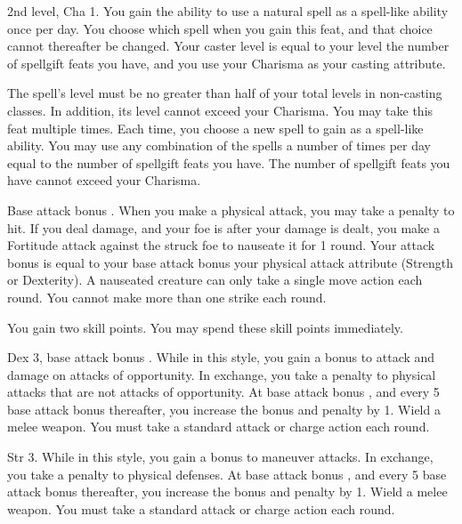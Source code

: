 \featpre 2nd level, Cha 1.
\featben You gain the ability to use a natural spell as a spell-like ability once per day. You choose which spell when you gain this feat, and that choice cannot thereafter be changed. Your caster level is equal to your level \add the number of spellgift feats you have, and you use your Charisma as your casting attribute.

The spell's level must be no greater than half of your total levels in non-casting classes. In addition, its level cannot exceed your Charisma.
 You may take this feat multiple times. Each time, you choose a new spell to gain as a spell-like ability. You may use any combination of the spells a number of times per day equal to the number of spellgift feats you have. The number of spellgift feats you have cannot exceed your Charisma.

\featpre Base attack bonus .
\featben When you make a physical attack, you may take a  penalty to hit. If you deal damage, and your foe is \bloodied after your damage is dealt, you make a Fortitude attack against the struck foe to nauseate it for 1 round. Your attack bonus is equal to your base attack bonus \add your physical attack attribute (Strength or Dexterity). A nauseated creature can only take a single move action each round. You cannot make more than one strike each round.

 You gain two skill points. You may spend these skill points immediately.

 Dex 3, base attack bonus .
 While in this style, you gain a  bonus to attack and damage on attacks of opportunity. In exchange, you take a  penalty to physical attacks that are not attacks of opportunity. At base attack bonus , and every 5 base attack bonus thereafter, you increase the bonus and penalty by 1.
\stylereq Wield a melee weapon. You must take a standard attack or charge action each round.

 Str 3.
 While in this style, you gain a  bonus to maneuver attacks. In exchange, you take a  penalty to physical defenses. At base attack bonus , and every 5 base attack bonus thereafter, you increase the bonus and penalty by 1.
\stylereq Wield a melee weapon. You must take a standard attack or charge action each round.


